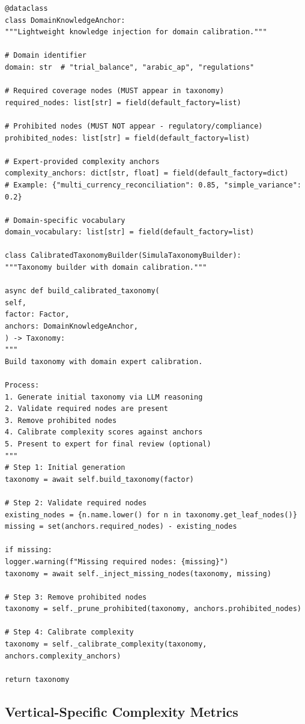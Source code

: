 \documentclass[12pt,a4paper,twoside]{report}
\begin{document}
\begin{lstlisting}[language=jsonx,caption={Domain knowledge anchor injection.}]
@dataclass
class DomainKnowledgeAnchor:
"""Lightweight knowledge injection for domain calibration."""

# Domain identifier
domain: str  # "trial_balance", "arabic_ap", "regulations"

# Required coverage nodes (MUST appear in taxonomy)
required_nodes: list[str] = field(default_factory=list)

# Prohibited nodes (MUST NOT appear - regulatory/compliance)
prohibited_nodes: list[str] = field(default_factory=list)

# Expert-provided complexity anchors
complexity_anchors: dict[str, float] = field(default_factory=dict)
# Example: {"multi_currency_reconciliation": 0.85, "simple_variance": 0.2}

# Domain-specific vocabulary
domain_vocabulary: list[str] = field(default_factory=list)

class CalibratedTaxonomyBuilder(SimulaTaxonomyBuilder):
"""Taxonomy builder with domain calibration."""

async def build_calibrated_taxonomy(
self,
factor: Factor,
anchors: DomainKnowledgeAnchor,
) -> Taxonomy:
"""
Build taxonomy with domain expert calibration.

Process:
1. Generate initial taxonomy via LLM reasoning
2. Validate required nodes are present
3. Remove prohibited nodes
4. Calibrate complexity scores against anchors
5. Present to expert for final review (optional)
"""
# Step 1: Initial generation
taxonomy = await self.build_taxonomy(factor)

# Step 2: Validate required nodes
existing_nodes = {n.name.lower() for n in taxonomy.get_leaf_nodes()}
missing = set(anchors.required_nodes) - existing_nodes

if missing:
logger.warning(f"Missing required nodes: {missing}")
taxonomy = await self._inject_missing_nodes(taxonomy, missing)

# Step 3: Remove prohibited nodes
taxonomy = self._prune_prohibited(taxonomy, anchors.prohibited_nodes)

# Step 4: Calibrate complexity
taxonomy = self._calibrate_complexity(taxonomy, anchors.complexity_anchors)

return taxonomy
\end{lstlisting}

\subsection{Vertical-Specific Complexity Metrics}
\end{document}
